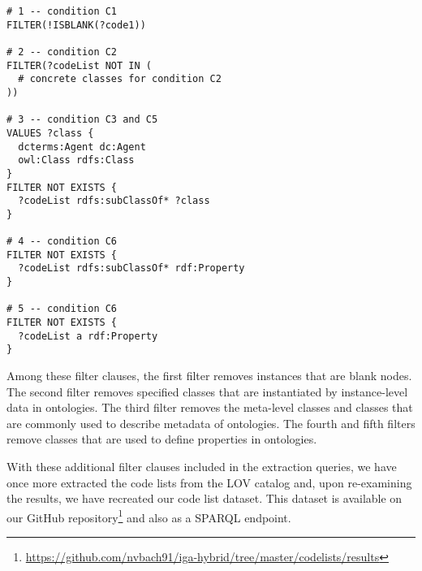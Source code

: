 
\begin{lstlisting}[captionpos=b, caption=FILTER clauses to improve code list extraction results,label=lst:sparql15,basicstyle=\small\ttfamily,frame=single]
# 1 -- condition C1
FILTER(!ISBLANK(?code1))

# 2 -- condition C2
FILTER(?codeList NOT IN (
  # concrete classes for condition C2
))

# 3 -- condition C3 and C5
VALUES ?class { 
  dcterms:Agent dc:Agent
  owl:Class rdfs:Class
}
FILTER NOT EXISTS {
  ?codeList rdfs:subClassOf* ?class
}

# 4 -- condition C6
FILTER NOT EXISTS {
  ?codeList rdfs:subClassOf* rdf:Property
}

# 5 -- condition C6
FILTER NOT EXISTS {
  ?codeList a rdf:Property
}
\end{lstlisting}

Among these filter clauses, the first filter removes instances that are blank nodes. The second filter removes specified classes that are instantiated by instance-level data in ontologies. The third filter removes the meta-level classes and classes that are commonly used to describe metadata of ontologies. The fourth and fifth filters remove classes that are used to define properties in ontologies.

With these additional filter clauses included in the extraction queries, we have once more extracted the code lists from the LOV catalog and, upon re-examining the results, we have recreated our code list dataset. This dataset is available on our GitHub repository\footnote{\url{https://github.com/nvbach91/iga-hybrid/tree/master/codelists/results}} and also as a SPARQL endpoint.
